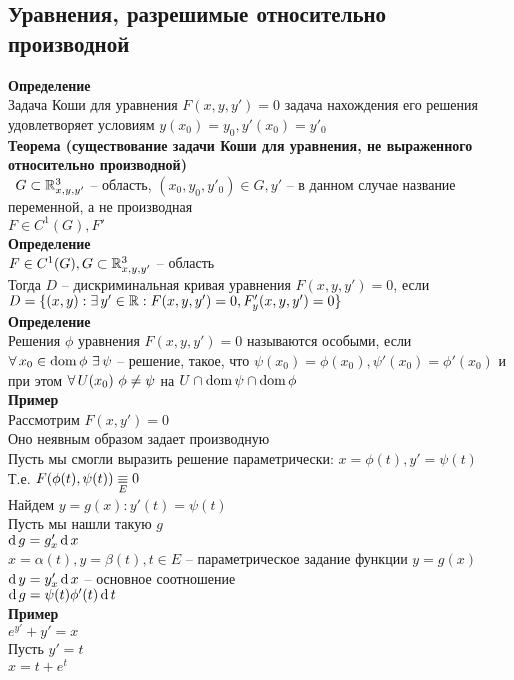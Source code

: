 \documentclass[12pt]{article}
\begin{document}
\subsection{Уравнения, разрешимые относительно производной}
\textbf{Определение}\\
Задача Коши для уравнения $F(x, y, y') = 0$ задача нахождения его решения удовлетворяет условиям $y(x_0)=y_0, y'(x_0) = y'_0$\\
\textbf{Теорема (существование задачи Коши для уравнения, не выраженного относительно производной)}\\\
$G \subset \mathbb{R}^3_{x, y, y'}$ -- область, $(x_0, y_0, y'_0) \in G, y'$ -- в данном случае название переменной, а не производная\\
$F \in C^1(G), F'$\\
\textbf{Определение}\\
$F\in C^1(G), G\subset \mathbb{R}^3_{x,y,y'}$ -- область\\
Тогда $D$ -- дискриминальная кривая уравнения $F(x,y,y') = 0$, если $D=\{(x,y): \exists\, y'\in \mathbb{R}: F(x,y,y')=0, F'_y(x,y,y')=0\}$\\
\textbf{Определение}\\
Решения $\phi$ уравнения $F(x,y,y')=0$ называются особыми, если $\forall\, x_0 \in \operatorname{dom} \phi\ \exists\, \psi$ -- решение, такое, что $\psi(x_0)=\phi(x_0), \psi'(x_0)=\phi'(x_0)$ и при этом $\forall\, U(x_0)\ \phi \neq \psi$ на $U \cap \operatorname{dom} \psi \cap \operatorname{dom} \phi$\\
\textbf{Пример}\\
Рассмотрим $F(x, y') = 0$\\
Оно неявным образом задает производную\\
Пусть мы смогли выразить решение параметрически: $x=\phi(t), y'=\psi(t)$\\
Т.е. $F(\phi(t), \psi(t)) \underset E\equiv 0$\\
Найдем $y = g(x): y'(t)=\psi(t)$\\
Пусть мы нашли такую $g$\\
$\operatorname{d} g = g'_x\operatorname{d} x$\\
$x = \alpha(t), y=\beta(t), t \in E$ -- параметрическое задание функции $y=g(x)$\\
$\operatorname{d} y = y'_x\operatorname{d} x$ -- основное соотношение\\
$\operatorname{d} g = \psi(t)\phi'(t)\operatorname{d} t$\\
\textbf{Пример}\\
$e^{y'}+y' = x$\\
Пусть $y'=t$\\
$x = t + e^t$\\
\end{document}
